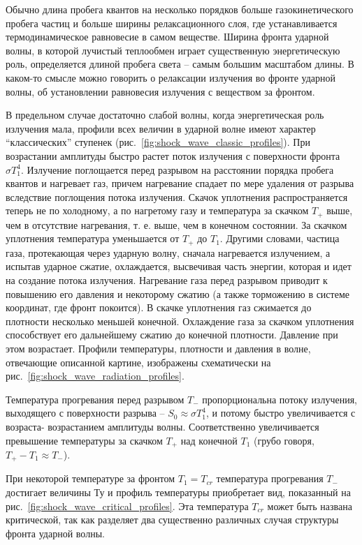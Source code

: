 \documentclass[10pt, a4paper]{article}
\begin{document}
Обычно длина пробега квантов на несколько порядков больше газокинетического пробега частиц и больше ширины релаксационного слоя, где устанавливается термодинамическое равновесие в самом веществе. Ширина фронта ударной волны, в которой лучистый теплообмен играет существенную энергетическую роль, определяется длиной пробега света -- самым большим масштабом длины. В каком-то смысле можно говорить о релаксации излучения во фронте ударной волны, об установлении равновесия излучения с веществом за фронтом.

В предельном случае достаточно слабой волны, когда энергетическая роль излучения мала, профили всех величин в ударной волне имеют характер ``классических'' ступенек (рис.~\ref{fig:shock_wave_classic_profiles}). При возрастании амплитуды быстро растет поток излучения с поверхности фронта $\sigma T_1^4$. Излучение поглощается перед разрывом на расстоянии порядка пробега квантов и нагревает газ, причем нагревание спадает по мере удаления от разрыва вследствие поглощения потока излучения. Скачок уплотнения распространяется теперь не по холодному, а по нагретому газу и температура за скачком $T_{+}$ выше, чем в отсутствие нагревания, т. е. выше, чем в конечном состоянии. За скачком уплотнения температура уменьшается от $T_{+}$ до $T_1$. Другими словами, частица газа, протекающая через ударную волну, сначала нагревается излучением, а испытав ударное сжатие, охлаждается, высвечивая часть энергии, которая и идет на создание потока излучения. Нагревание газа перед разрывом приводит к повышению его давления и некоторому сжатию (а также торможению в системе координат, где фронт покоится). В скачке уплотнения газ сжимается до плотности несколько меньшей конечной. Охлаждение газа за скачком уплотнения способствует его дальнейшему сжатию до конечной плотности. Давление при этом возрастает. Профили температуры, плотности и давления в волне, отвечающие описанной картине, изображены схематически на рис.~\ref{fig:shock_wave_radiation_profiles}.

Температура прогревания перед разрывом $T_{-}$ пропорциональна потоку излучения, выходящего с поверхности разрыва -- $S_0\approx\sigma T_1^4$, и потому быстро увеличивается с возраста- возрастанием амплитуды волны. Соответственно увеличивается превышение температуры за скачком $T_{+}$ над конечной $T_1$ (грубо говоря, $T_{+}-T_1\approx T_{-}$).

При некоторой температуре за фронтом $T_1=T_{cr}$ температура прогревания $T_{-}$ достигает величины Ту и профиль температуры приобретает вид, показанный на рис.~\ref{fig:shock_wave_critical_profiles}. Эта температура $T_{cr}$ может быть названа критической, так как разделяет два существенно различных случая структуры фронта ударной волны.
\end{document}
